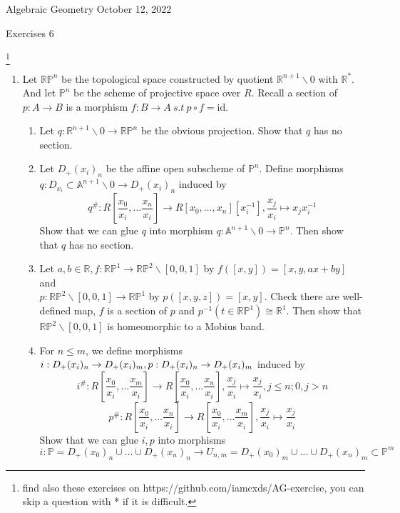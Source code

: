 \documentclass[a4paper,11pt]{article}
\def\bb#1{\mathbb{#1}}
\def\mrm#1{\mathrm{#1}}
\begin{document}
{\small Algebraic Geometry \hfill October 12, 2022 \\}
\begin{center}
\Huge Exercises 6
\end{center}

\vskip0.6cm
\footnote{find also these exercises on https://github.com/iamcxds/AG-exercise, you can skip a question with * if it is difficult.}

\begin{enumerate}[1.]
\item Let $\bb{R}\bb{P}^n$ be the topological space constructed by quotient $\bb{R}^{n+1}\backslash 0$ with $\bb{R}^*$. And let $\bb{P}^n$ be the scheme of projective space over $R$. Recall a section of $p:A\to B$ is a morphism $f:B\to A \ s.t \ p\circ f =\mrm{id}$.
\begin{enumerate}
    \item Let $q:\bb{R}^{n+1}\backslash 0 \to \bb{R}\bb{P}^n$ be the obvious projection. Show that $q$ has no section.
    \item Let $D_+(x_i)_n$ be the affine open subscheme of $\bb{P}^n$. Define  morphisms $q: D_{x_i}\subset \bb{A}^{n+1}\backslash 0 \to D_+(x_i)_n$ induced by 
    \[ q^\#: R[\frac{x_0}{x_i},\ldots \frac{x_n}{x_i}]\to R[x_0,\ldots,x_n][x_i^{-1}],  \frac{x_j}{x_i} \mapsto x_jx_i^{-1}\]
    Show that we can glue $q$ into morphism $q: \bb{A}^{n+1}\backslash 0 \to \bb{P}^n$. Then show that $q$ has no section.
    \item Let $a,b \in \bb{R}, f:\bb{R}\bb{P}^1\to \bb{R}\bb{P}^2\backslash[0,0,1] $ by $f([x,y])=[x,y,ax+by]$ and
    \\ $p:\bb{R}\bb{P}^2\backslash[0,0,1]\to\bb{R}\bb{P}^1$ by $p([x,y,z])=[x,y]$. Check there are well-defined map, $f$ is a section of $p$ and $p^{-1}(t\in \bb{R}\bb{P}^1)\cong \bb{R}^1$. 
    Then show that $\bb{R}\bb{P}^2\backslash[0,0,1]$ is homeomorphic to a Mobius band.
    \item  For $n\leq m$, we define morphisms $i: D_+(x_i)_n\to D_+(x_i)_m, \\p:D_+(x_i)_n\to D_+(x_i)_m$ induced by 
    \[i^\#:R[\frac{x_0}{x_i},\ldots \frac{x_m}{x_i}]\to R[\frac{x_0}{x_i},\ldots \frac{x_n}{x_i}],  \frac{x_j}{x_i} \mapsto \frac{x_j}{x_i}, j\leq n; 0 , j>n \]
    \[p^\#: R[\frac{x_0}{x_i},\ldots \frac{x_n}{x_i}]\to R[\frac{x_0}{x_i},\ldots \frac{x_m}{x_i}],  \frac{x_j}{x_i} \mapsto \frac{x_j}{x_i}\] 
    Show that we can glue $i, p$ into morphisms 
    \[i:\bb{P}= D_+(x_0)_n\cup \ldots \cup D_+(x_n)_n \to U_{n,m}= D_+(x_0)_m\cup \ldots  \cup D_+(x_n)_m \subset \bb{P}^m \]

\end{enumerate}
\end{enumerate}
\end{document}

